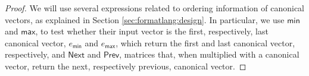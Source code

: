 \begin{proof}
    We will use several expressions related to ordering information of canonical vectors, as explained in Section \ref{sec:formatlang:design}.
	In particular, we use $\mathsf{min}$ and $\mathsf{max}$, to test whether their input vector is the first, respectively, last canonical
	vector, $e_{\mathsf{min}}$ and $e_{\mathsf{max}}$, which return the first and last canonical vector, respectively, and $\mathsf{Next}$
	and $\mathsf{Prev}$, matrices that, when multiplied with a canonical vector, return the next, respectively previous, canonical vector.

\end{proof}
